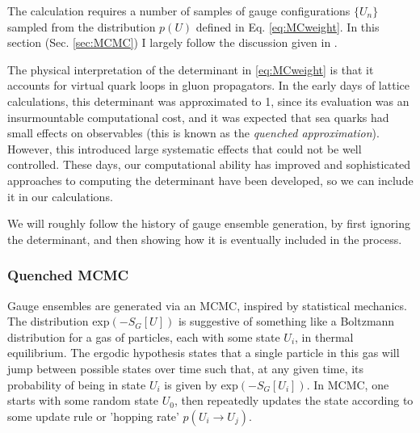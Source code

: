 The calculation requires a number of samples of gauge configurations $\{U_n\}$ sampled from the distribution $p(U)$ defined in Eq. \eqref{eq:MCweight}. In this section (Sec. \ref{sec:MCMC}) I largely follow the discussion given in \cite{DeGrand:2006zz}.

The physical interpretation of the determinant in \eqref{eq:MCweight} is that it accounts for virtual quark loops in gluon propagators. In the early days of lattice calculations, this determinant was approximated to 1, since its evaluation was an insurmountable computational cost, and it was expected that sea quarks had small effects on observables (this is known as the {\it{quenched approximation}}). However, this introduced large systematic effects that could not be well controlled. These days, our computational ability has improved and sophisticated approaches to computing the determinant have been developed, so we can include it in our calculations.

We will roughly follow the history of gauge ensemble generation, by first ignoring the determinant, and then showing how it is eventually included in the process.

\subsubsection{Quenched MCMC}

Gauge ensembles are generated via an MCMC, inspired by statistical mechanics. The distribution exp$(-S_G[U])$ is suggestive of something like a Boltzmann distribution for a gas of particles, each with some state $U_i$, in thermal equilibrium. The ergodic hypothesis states that a single particle in this gas will jump between possible states over time such that, at any given time, its probability of being in state $U_i$ is given by exp$(-S_G[U_i])$. In MCMC, one starts with some random state $U_0$, then repeatedly updates the state according to some update rule or 'hopping rate' $p(U_i\to U_j)$. 

